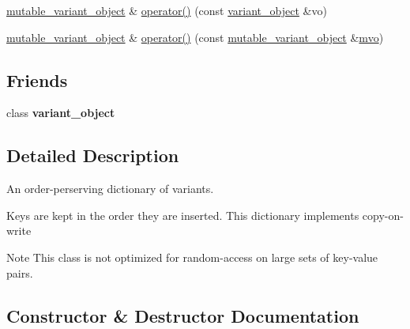\begin{Indent}
\begin{DoxyCompactItemize}
\item 
\mbox{\hyperlink{classfc_1_1mutable__variant__object}{mutable\+\_\+variant\+\_\+object}} \& \mbox{\hyperlink{classfc_1_1mutable__variant__object_a4a6abfc7da25a302390f940f58154ff3}{operator()}} (const \mbox{\hyperlink{classfc_1_1variant__object}{variant\+\_\+object}} \&vo)
\item 
\mbox{\hyperlink{classfc_1_1mutable__variant__object}{mutable\+\_\+variant\+\_\+object}} \& \mbox{\hyperlink{classfc_1_1mutable__variant__object_a030da450c7e13f703aec3fd9b32a9ea0}{operator()}} (const \mbox{\hyperlink{classfc_1_1mutable__variant__object}{mutable\+\_\+variant\+\_\+object}} \&\mbox{\hyperlink{classfc_1_1mutable__variant__object}{mvo}})
\end{DoxyCompactItemize}
\end{Indent}
\subsection*{Friends}
\begin{DoxyCompactItemize}
\item 
\mbox{\label{classfc_1_1mutable__variant__object_a5176d6f7f43fdd9dbd614ce9b8f4b1fe}} 
class {\bfseries variant\+\_\+object}
\end{DoxyCompactItemize}


\subsection{Detailed Description}
An order-\/perserving dictionary of variant\textquotesingle{}s. 

Keys are kept in the order they are inserted. This dictionary implements copy-\/on-\/write

\begin{DoxyNote}{Note}
This class is not optimized for random-\/access on large sets of key-\/value pairs. 
\end{DoxyNote}


\subsection{Constructor \& Destructor Documentation}
\mbox{\label{classfc_1_1mutable__variant__object_aad0bfd86a84c14612685df931e43a67a}} 
